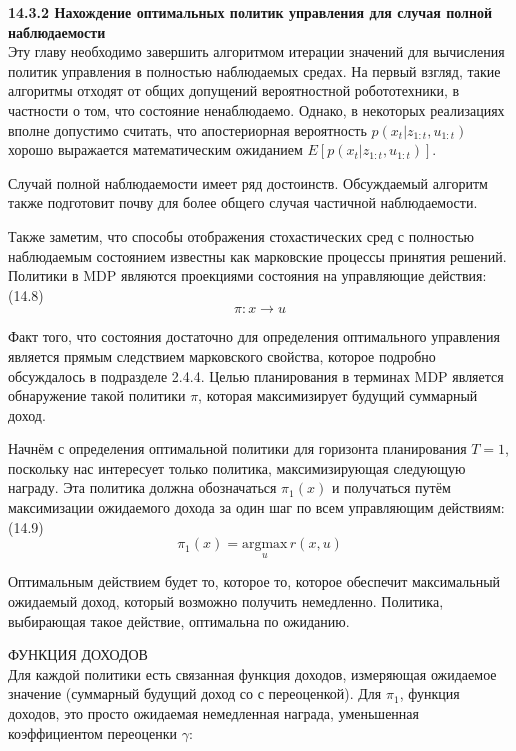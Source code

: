 \documentclass[10pt,a4paper]{article}
\begin{document}
\textbf{14.3.2	Нахождение оптимальных политик управления для случая полной наблюдаемости}\\

Эту главу необходимо завершить алгоритмом итерации значений для вычисления политик управления в полностью наблюдаемых средах. На первый взгляд, такие алгоритмы отходят от общих допущений вероятностной робототехники, в частности о том, что состояние ненаблюдаемо. Однако, в некоторых реализациях вполне допустимо считать, что апостериорная вероятность $p(x_t|z_{1:t}, u_{1:t})$ хорошо выражается математическим ожиданием $E[p(x_t|z_{1:t}, u_{1:t})]$.

Случай полной наблюдаемости имеет ряд достоинств. Обсуждаемый алгоритм также подготовит почву для более общего случая частичной наблюдаемости.

Также заметим, что способы отображения стохастических сред с полностью наблюдаемым состоянием известны как марковские процессы принятия решений. Политики в MDP являются проекциями состояния на управляющие действия:\\

(14.8)
$$\pi:x\longrightarrow u$$

Факт того, что состояния достаточно для определения оптимального управления является прямым следствием марковского свойства, которое подробно обсуждалось в подразделе 2.4.4. Целью планирования в терминах MDP является обнаружение такой политики $\pi$, которая максимизирует будущий суммарный доход.

Начнём с определения оптимальной политики для горизонта планирования $T = 1$, поскольку нас интересует только политика, максимизирующая следующую награду. Эта политика должна обозначаться $\pi_1(x)$ и получаться путём максимизации ожидаемого дохода за один шаг по всем управляющим действиям:\\

(14.9)
$$\pi_1(x)=\underset{u}{\text{argmax}}\,r(x,u)$$

Оптимальным действием будет то, которое то, которое обеспечит максимальный ожидаемый доход, который возможно получить немедленно. Политика, выбирающая такое действие, оптимальна по ожиданию. 

ФУНКЦИЯ ДОХОДОВ\\

Для каждой политики есть связанная  функция доходов, измеряющая ожидаемое значение (суммарный будущий доход со с переоценкой). Для $\pi_1$, функция доходов, это просто ожидаемая немедленная награда, уменьшенная коэффициентом переоценки $\gamma$:\\
\end{document}
